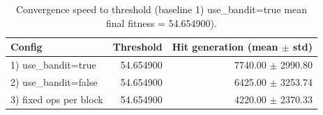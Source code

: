 \begin{table}[htbp]
\centering
\caption{Convergence speed to threshold (baseline 1) use_bandit=true mean final fitness = 54.654900).}
\label{tab:convergence_speed}
\begin{tabular}{lrr}
\toprule
Config & Threshold & Hit generation (mean $\pm$ std) \\
\midrule
1) use_bandit=true & 54.654900 & 7740.00 $\pm$ 2990.80 \\
2) use_bandit=false & 54.654900 & 6425.00 $\pm$ 3253.74 \\
3) fixed ops per block & 54.654900 & 4220.00 $\pm$ 2370.33 \\
\bottomrule
\end{tabular}
\end{table}
